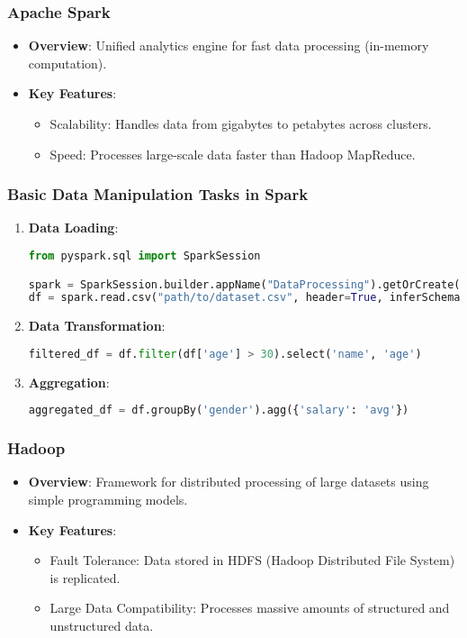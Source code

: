 \documentclass[aspectratio=169]{beamer}
\begin{document}
\begin{frame}[fragile]
    \frametitle{Apache Spark}
    \begin{itemize}
        \item \textbf{Overview}: Unified analytics engine for fast data processing (in-memory computation).
        \item \textbf{Key Features}: 
        \begin{itemize}
            \item Scalability: Handles data from gigabytes to petabytes across clusters.
            \item Speed: Processes large-scale data faster than Hadoop MapReduce.
        \end{itemize}
    \end{itemize}
\end{frame}

\begin{frame}[fragile]
    \frametitle{Basic Data Manipulation Tasks in Spark}
    \begin{enumerate}
        \item \textbf{Data Loading}:
        \begin{lstlisting}[language=python]
from pyspark.sql import SparkSession

spark = SparkSession.builder.appName("DataProcessing").getOrCreate()
df = spark.read.csv("path/to/dataset.csv", header=True, inferSchema=True)
        \end{lstlisting}
        
        \item \textbf{Data Transformation}:
        \begin{lstlisting}[language=python]
filtered_df = df.filter(df['age'] > 30).select('name', 'age')
        \end{lstlisting}

        \item \textbf{Aggregation}:
        \begin{lstlisting}[language=python]
aggregated_df = df.groupBy('gender').agg({'salary': 'avg'})
        \end{lstlisting}
    \end{enumerate}
\end{frame}

\begin{frame}[fragile]
    \frametitle{Hadoop}
    \begin{itemize}
        \item \textbf{Overview}: Framework for distributed processing of large datasets using simple programming models.
        \item \textbf{Key Features}: 
        \begin{itemize}
            \item Fault Tolerance: Data stored in HDFS (Hadoop Distributed File System) is replicated.
            \item Large Data Compatibility: Processes massive amounts of structured and unstructured data.
        \end{itemize}
    \end{itemize}
\end{frame}
\end{document}
